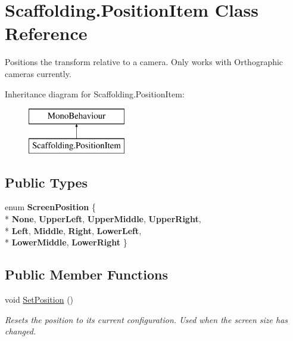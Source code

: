 \hypertarget{class_scaffolding_1_1_position_item}{\section{Scaffolding.\-Position\-Item Class Reference}
\label{class_scaffolding_1_1_position_item}
}


Positions the transform relative to a camera. Only works with Orthographic cameras currently.  


Inheritance diagram for Scaffolding.\-Position\-Item\-:\begin{figure}[H]
\begin{center}
\leavevmode
\includegraphics[height=2.000000cm]{class_scaffolding_1_1_position_item}
\end{center}
\end{figure}
\subsection*{Public Types}
\begin{DoxyCompactItemize}
\item 
enum {\bfseries Screen\-Position} \{ \\*
{\bfseries None}, 
{\bfseries Upper\-Left}, 
{\bfseries Upper\-Middle}, 
{\bfseries Upper\-Right}, 
\\*
{\bfseries Left}, 
{\bfseries Middle}, 
{\bfseries Right}, 
{\bfseries Lower\-Left}, 
\\*
{\bfseries Lower\-Middle}, 
{\bfseries Lower\-Right}
 \}
\end{DoxyCompactItemize}
\subsection*{Public Member Functions}
\begin{DoxyCompactItemize}
\item 
void \hyperlink{class_scaffolding_1_1_position_item_acf8866c7ad64b0d81429c5dfa95482fd}{Set\-Position} ()
\begin{DoxyCompactList}\small\item\em Resets the position to its current configuration. Used when the screen size has changed. \end{DoxyCompactList}\end{DoxyCompactItemize}
